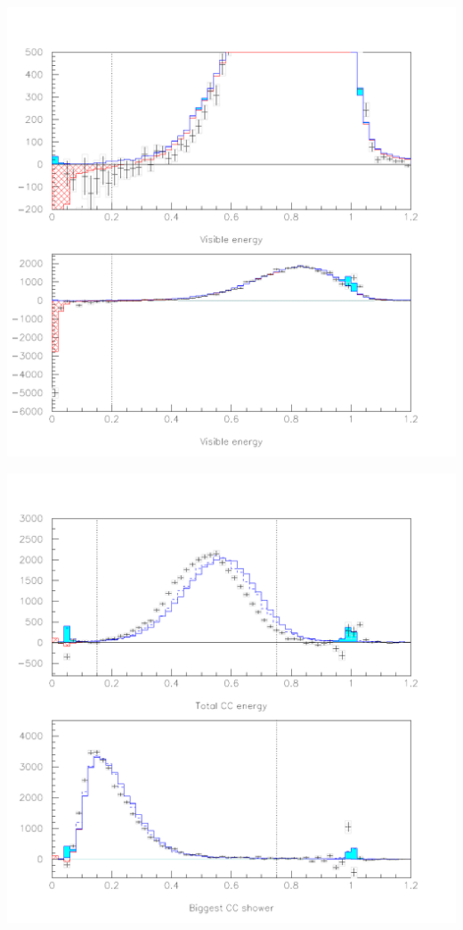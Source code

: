 \documentclass[landscape]{article}
\begin{document}
\begin{center}
  \includegraphics[height=\textheight]{tr2_visen2.pdf}
\end{center}

\begin{center}
  \includegraphics[height=\textheight]{tr2_cc.pdf}
\end{center}
\end{document}
